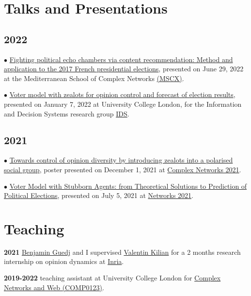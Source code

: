 \documentclass[a4paper,10pt]{article}
\begin{document}
\section*{Talks and Presentations}
\subsection*{2022}
$\bullet$ \href{https://antoinevendeville.github.io/files/presCatania.pdf}{Fighting political echo chambers via content recommendation: Method and application to the 2017 French presidential elections}, presented on June 29, 2022 at the Mediterranean School of Complex Networks \href{https://mediterraneanschoolcomplex.net/}{(MSCX)}.

$\bullet$ \href{https://antoinevendeville.github.io/files/talk_IDS.pdf}{Voter model with zealots for opinion control and forecast of election results}, presented on January 7, 2022 at University College London, for the Information and Decision Systems research group \href{https://www.ucl.ac.uk/computer-science/research/research-groups/information-and-decision-systems-ids}{IDS}.

\subsection*{2021}
$\bullet$ \href{https://antoinevendeville.github.io/files/poster_complexnet21.pdf}{Towards control of opinion diversity by introducing zealots into a polarised social group}, poster presented on December 1, 2021 at \href{https://complexnetworks.org/}{Complex Networks 2021}.

$\bullet$ \href{https://antoinevendeville.github.io/files/talk_networks21.pdf}{Voter Model with Stubborn Agents: from Theoretical Solutions to Prediction of Political Elections}, presented on July 5, 2021 at \href{https://networks2021.net/}{Networks 2021}.

\section*{Teaching}
\textbf{2021} \href{https://bguedj.github.io/}{Benjamin Guedj} and I supervised \href{https://valentinkil.github.io/}{Valentin Kilian} for a 2 months research internship on opinion dynamics at \href{https://www.inria.fr/en}{Inria}.

\textbf{2019-2022} teaching assistant at University College London for \href{https://www.ucl.ac.uk/module-catalogue/modules/complex-networks-and-web/COMP0123}{Complex Networks and Web (COMP0123)}.
\end{document}
